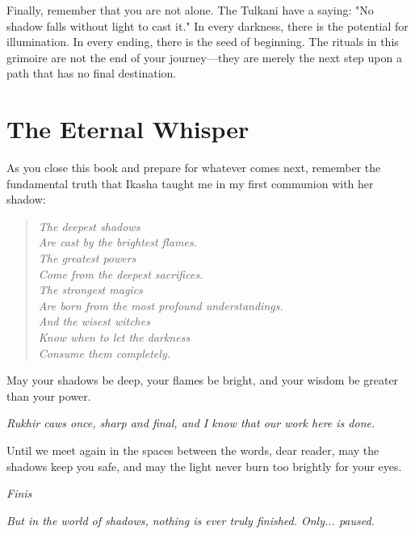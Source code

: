 \documentclass[12pt,twoside]{book}
\newcommand{\shadow}[1]{\textit{#1}}
\begin{document}
Finally, remember that you are not alone. The Tulkani have a saying: "No shadow falls without light to cast it." In every darkness, there is the potential for illumination. In every ending, there is the seed of beginning. The rituals in this grimoire are not the end of your journey—they are merely the next step upon a path that has no final destination.

\section*{The Eternal Whisper}

As you close this book and prepare for whatever comes next, remember the fundamental truth that Ikasha taught me in my first communion with her shadow:

\begin{verse}
\textit{The deepest shadows} \\
\textit{Are cast by the brightest flames.} \\
\textit{The greatest powers} \\
\textit{Come from the deepest sacrifices.} \\
\textit{The strongest magics} \\
\textit{Are born from the most profound understandings.} \\
\textit{And the wisest witches} \\
\textit{Know when to let the darkness} \\
\textit{Consume them completely.}
\end{verse}

May your shadows be deep, your flames be bright, and your wisdom be greater than your power.

\shadow{Rukhir caws once, sharp and final, and I know that our work here is done.}

Until we meet again in the spaces between the words, dear reader, may the shadows keep you safe, and may the light never burn too brightly for your eyes.

\begin{center}
\textit{Finis}
\end{center}

\shadow{But in the world of shadows, nothing is ever truly finished. Only... paused.}
\end{document}
